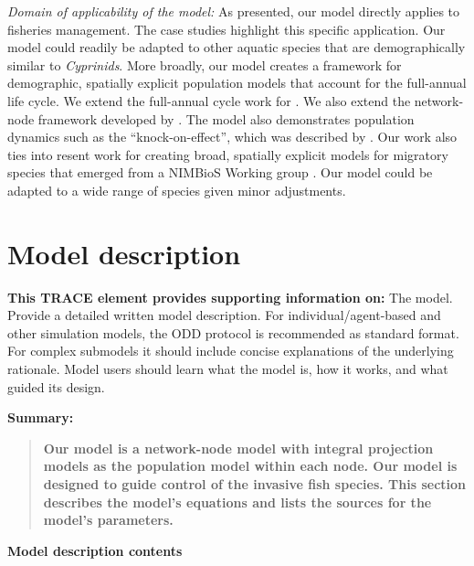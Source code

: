 \documentclass{article}[12pt]
\begin{document}
\textit{Domain of applicability of the model:}
As presented, our model directly applies to fisheries management.
The case studies highlight  this specific application.
Our model could readily be adapted to other aquatic species that are demographically similar to \textit{Cyprinids}. 
More broadly, our model creates a framework for demographic, spatially explicit population models that account for the full-annual life cycle.
We extend the full-annual cycle work for \citet{hostetler2015full}.
We also extend the network-node framework developed by \citet{Taylor:2010}.
The model also demonstrates population dynamics such as the ``knock-on-effect'', which was described by \citep{betini2015experimental}.
Our work also ties into resent work for creating broad, spatially explicit models for migratory species that emerged from a NIMBioS Working group \citep[e.g.,][]{wiederholt2017estimating, sample2017general, erickson2017defining, bieriGuide2018}.
Our model could be adapted to a wide range of species given minor adjustments. 





\section{Model description}\label{sec:md}
\textbf{This TRACE element provides supporting information on:} The model. Provide a detailed written model description. For individual/agent-based and other simulation models, the ODD protocol is recommended as standard format. For complex submodels it should include concise explanations of the underlying rationale. Model users should learn what the model is, how it works, and what guided its design.


\textbf{Summary:}
\begin{verse}
\textbf{
Our model is a network-node model with integral projection models as the population model within each node.  
Our model is designed to guide control of the invasive fish species.
This section describes the model's equations and lists the sources for the model's parameters.
}
\end{verse}


 \textbf{Model description  contents}
\startcontents[sections]

\end{document}
